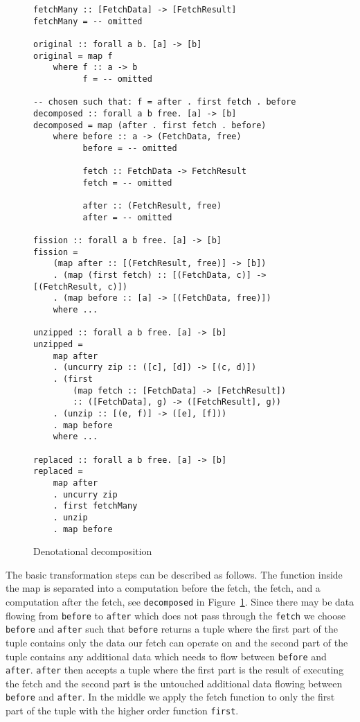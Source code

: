 \begin{figure}[h]
\begin{verbatim}
fetchMany :: [FetchData] -> [FetchResult]
fetchMany = -- omitted

original :: forall a b. [a] -> [b]
original = map f
    where f :: a -> b
          f = -- omitted

-- chosen such that: f = after . first fetch . before
decomposed :: forall a b free. [a] -> [b]
decomposed = map (after . first fetch . before)
    where before :: a -> (FetchData, free)
          before = -- omitted

          fetch :: FetchData -> FetchResult
          fetch = -- omitted

          after :: (FetchResult, free)
          after = -- omitted

fission :: forall a b free. [a] -> [b]
fission =
    (map after :: [(FetchResult, free)] -> [b])
    . (map (first fetch) :: [(FetchData, c)] -> [(FetchResult, c)])
    . (map before :: [a] -> [(FetchData, free)])
    where ...

unzipped :: forall a b free. [a] -> [b]
unzipped =
    map after
    . (uncurry zip :: ([c], [d]) -> [(c, d)])
    . (first
        (map fetch :: [FetchData] -> [FetchResult])
        :: ([FetchData], g) -> ([FetchResult], g))
    . (unzip :: [(e, f)] -> ([e], [f]))
    . map before
    where ...

replaced :: forall a b free. [a] -> [b]
replaced =
    map after
    . uncurry zip
    . first fetchMany
    . unzip
    . map before
\end{verbatim}
\caption{Denotational decomposition}
\label{fig:map-decomposition-in-code}

\end{figure}

The basic transformation steps can be described as follows.
The function inside the map is separated into a computation before the fetch, the fetch, and a computation after the fetch, see \texttt{decomposed} in Figure~\ref{fig:map-decomposition-in-code}.
Since there may be data flowing from \texttt{before} to \texttt{after} which does not pass through the \texttt{fetch} we choose \texttt{before} and \texttt{after} such that \texttt{before} returns a tuple where the first part of the tuple contains only the data our fetch can operate on and the second part of the tuple contains any additional data which needs to flow between \texttt{before} and \texttt{after}.
\texttt{after} then accepts a tuple where the first part is the result of executing the fetch and the second part is the untouched additional data flowing between \texttt{before} and \texttt{after}.
In the middle we apply the fetch function to only the first part of the tuple with the higher order function \texttt{first}.

